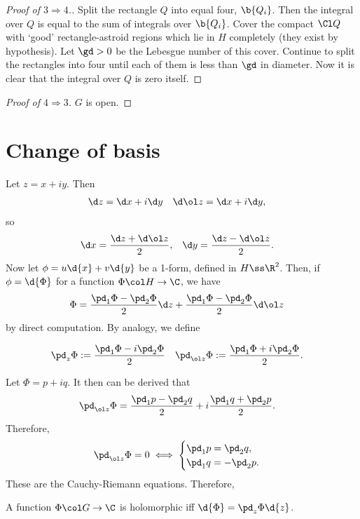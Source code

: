\begin{proof}[Proof of $3 \Rightarrow 4$.]
  Split the rectangle $Q$ into equal four, $\b{Q_i}$.
  Then the integral over $Q$ is equal to the sum of integrals over $\b{Q_i}$.
  Cover the compact $\Cl Q$ with `good' rectangle-astroid regions which lie in $H$ completely (they exist by hypothesis).
  Let $\gd > 0$ be the Lebesgue number of this cover.
  Continue to split the rectangles into four until each of them is less than $\gd$ in diameter.
  Now it is clear that the integral over $Q$ is zero itself.
\end{proof}

\begin{proof}[Proof of $4 \Rightarrow 3$]
  $G$ is open.
\end{proof}

\section{Change of basis}

Let $z = x+iy$. Then
\begin{align*}
  \d z &= \d x + i \d y &
  \d \ol z &= \d x + i \d y,
\end{align*}
so
\begin{align*}
  \d x &= \frac{\d z + \d \ol z}{2}, &
  \d y &= \frac{\d z - \d \ol z}{2}.
\end{align*}
Now let $\phi = u \d{x} +v\d{y}$ be a 1-form, defined in $H \ss \R^2$. Then, if $\phi = \d{\Phi}$ for a function $\Phi \col H \to \C$, we have
\begin{align*}
  \Phi &= \frac{\pd_1 \Phi - \pd_2 \Phi}{2} \d z
  + \frac{\pd_1 \Phi - \pd_2 \Phi}{2} \d \ol z
\end{align*}
by direct computation.
By analogy, we define
\begin{definition}
  \begin{align*}
  \pd_z \Phi &:= \frac{\pd_1 \Phi - i \pd_2 \Phi}{2} &
  \pd_{\ol z} \Phi &:= \frac{\pd_1 \Phi + i \pd_2 \Phi}{2}.
\end{align*}
\end{definition}
Let $\Phi = p + iq$.
It then can be derived that
\begin{align*}
  \pd_{\ol z} \Phi
  &= \frac{\pd_1 p - \pd_2 q}{2}
  + i \frac{\pd_1 q + \pd_2 p}{2}.
\end{align*}
Therefore,
\begin{align*}
  \pd_{\ol z} \Phi = 0 
  \iff
  \begin{cases}
    \pd_1 p = \pd_2 q, \\
    \pd_1 q = -\pd_2 p.
  \end{cases}
\end{align*}
These are the Cauchy-Riemann equations.
Therefore,
\begin{lemma}
  A function $\Phi \col G \to \C$ is holomorphic iff $\d{\Phi} = \pd_{z} \Phi \d{z}$.
\end{lemma}

